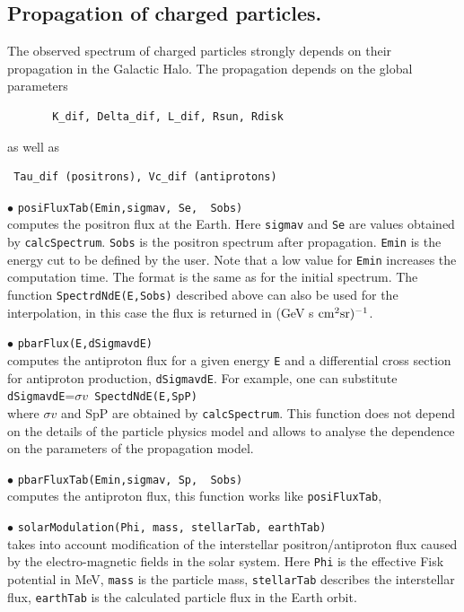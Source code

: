 \documentclass[12pt,a4paper]{article}
\begin{document}
\subsection{Propagation of charged particles.}

The observed spectrum of charged particles  strongly depends on their propagation
in the Galactic Halo. The propagation depends on the global parameters 
\begin{verbatim}
       K_dif, Delta_dif, L_dif, Rsun, Rdisk
\end{verbatim}
as well as 
\begin{verbatim}
 Tau_dif (positrons), Vc_dif (antiprotons)
\end{verbatim}

\noindent  
$\bullet$ \verb|posiFluxTab(Emin,sigmav, Se,  Sobs)|\\
computes the positron flux at the Earth. Here \verb|sigmav| and \verb|Se| are values obtained by 
\verb|calcSpectrum|.  \verb|Sobs| is the positron spectrum after propagation. \verb|Emin| is the energy cut to be defined by the user. Note that
a low value for \verb|Emin| increases the computation time.
The  format is the same as for the initial spectrum. The function  
\verb|SpectrdNdE(E,Sobs)| described above can also be used for the interpolation, in this case the flux is
returned in (GeV s ${\rm cm}^2 {\rm sr})^{-1}$. 

\noindent
$\bullet$ \verb|pbarFlux(E,dSigmavdE)|\\
computes the antiproton flux for a given energy {\tt E} and a 
differential cross section for antiproton production, {\tt dSigmavdE}.
For example, one can substitute\\ {\tt dSigmavdE}=$\sigma v${\tt
SpectdNdE(E,SpP)} \\
where $ \sigma v$ and {SpP} are obtained by {\tt calcSpectrum}.
This function does not depend on the details of the particle physics  model and allows to analyse the dependence on the
parameters of the propagation model.

\noindent
$\bullet$ \verb|pbarFluxTab(Emin,sigmav, Sp,  Sobs)|\\
computes the antiproton flux, this function works like \verb|posiFluxTab|,

\noindent
$\bullet$ \verb|solarModulation(Phi, mass, stellarTab, earthTab)|\\
takes into account modification of the interstellar positron/antiproton flux 
caused by the electro-magnetic fields in the solar system. Here \verb|Phi| is the
effective Fisk potential in MeV, \verb|mass| is the particle mass,
\verb|stellarTab| describes the interstellar flux, \verb|earthTab| 
is the calculated particle flux in the Earth orbit.
\end{document}

